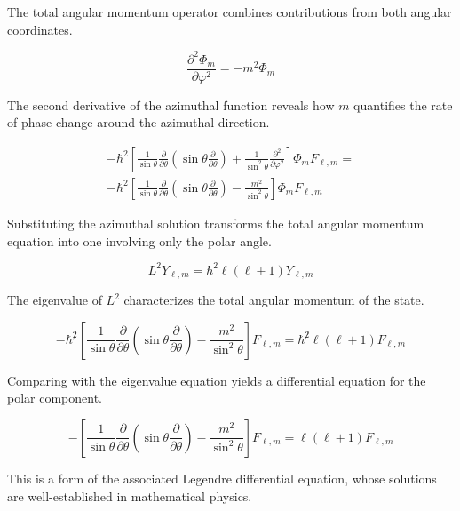 The total angular momentum operator combines contributions from both angular coordinates.

\begin{equation}
\frac{\partial^{2} \Phi_{m}}{\partial \varphi^{2}}=-m^{2} \Phi_{m}
\end{equation}

The second derivative of the azimuthal function reveals how $m$ quantifies the rate of phase change around the azimuthal direction.

\[
\begin{array}{r}
-\hbar^{2}\left[\frac{1}{\sin \theta} \frac{\partial}{\partial \theta}\left(\sin \theta \frac{\partial}{\partial \theta}\right)+\frac{1}{\sin ^{2} \theta} \frac{\partial^{2}}{\partial \varphi^{2}}\right] \Phi_{m} F_{\ell, m}=  \\
-\hbar^{2}\left[\frac{1}{\sin \theta} \frac{\partial}{\partial \theta}\left(\sin \theta \frac{\partial}{\partial \theta}\right)-\frac{m^{2}}{\sin ^{2} \theta}\right] \Phi_{m} F_{\ell, m}
\end{array}
\]

Substituting the azimuthal solution transforms the total angular momentum equation into one involving only the polar angle.

\begin{equation}
L^{2} Y_{\ell, m}=\hbar^{2} \ell(\ell+1) Y_{\ell, m}
\end{equation}

The eigenvalue of $L^2$ characterizes the total angular momentum of the state.

\begin{equation}
-\hbar^{\not 2}\left[\frac{1}{\sin \theta} \frac{\partial}{\partial \theta}\left(\sin \theta \frac{\partial}{\partial \theta}\right)-\frac{m^{2}}{\sin ^{2} \theta}\right] F_{\ell, m}=\hbar^{\not 2} \ell(\ell+1) F_{\ell, m}
\end{equation}

Comparing with the eigenvalue equation yields a differential equation for the polar component.

\begin{equation}
-\left[\frac{1}{\sin \theta} \frac{\partial}{\partial \theta}\left(\sin \theta \frac{\partial}{\partial \theta}\right)-\frac{m^{2}}{\sin ^{2} \theta}\right] F_{\ell, m}=\ell(\ell+1) F_{\ell, m}
\end{equation}

This is a form of the associated Legendre differential equation, whose solutions are well-established in mathematical physics.

